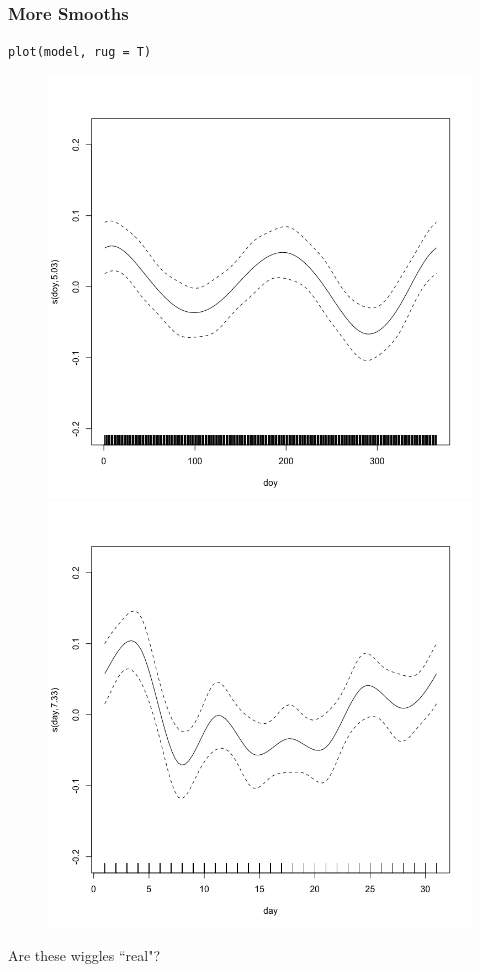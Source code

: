 \documentclass{beamer}
\begin{document}
\begin{frame}
\frametitle{More Smooths}
\begin{center}
\texttt{plot(model, rug = T)}
\end{center}

\begin{figure}
\includegraphics[scale=.2]{figures/exampleSmooth1b}
\includegraphics[scale=.2]{figures/exampleSmooth2b}
\end{figure}

Are these wiggles ``real"?

\end{frame}
\end{document}

